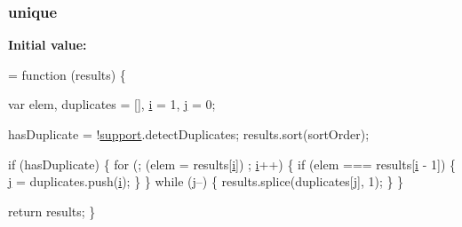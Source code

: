 \subsubsection[{\texorpdfstring{unique}{unique}}]{ unique}\hypertarget{jquery-2_82_81-vsdoc_8js_a55d5adf9da69a81b8295f6bedfc34f60}{}\label{jquery-2_82_81-vsdoc_8js_a55d5adf9da69a81b8295f6bedfc34f60}
{\bfseries Initial value\+:}
\begin{DoxyCode}
= \textcolor{keyword}{function} (results) \{
        

        var elem,
            duplicates = [],
            \hyperlink{geolocation-marker_8js_a0325b7ce0988782a8032e720ef3aa411}{i} = 1,
            \hyperlink{geolocation-marker_8js_af0ba8fb208a5f5ab73eb0859811a23f8}{j} = 0;

        
        hasDuplicate = !\hyperlink{jquery-2_82_81-vsdoc_8js_a1be69652377630fc5432ae5ec6463744}{support}.detectDuplicates;
        results.sort(sortOrder);

        \textcolor{keywordflow}{if} (hasDuplicate) \{
            \textcolor{keywordflow}{for} (; (elem = results[\hyperlink{geolocation-marker_8js_a0325b7ce0988782a8032e720ef3aa411}{i}]) ; \hyperlink{geolocation-marker_8js_a0325b7ce0988782a8032e720ef3aa411}{i}++) \{
                \textcolor{keywordflow}{if} (elem === results[\hyperlink{geolocation-marker_8js_a0325b7ce0988782a8032e720ef3aa411}{i} - 1]) \{
                    \hyperlink{geolocation-marker_8js_af0ba8fb208a5f5ab73eb0859811a23f8}{j} = duplicates.push(\hyperlink{geolocation-marker_8js_a0325b7ce0988782a8032e720ef3aa411}{i});
                \}
            \}
            \textcolor{keywordflow}{while} (\hyperlink{geolocation-marker_8js_af0ba8fb208a5f5ab73eb0859811a23f8}{j}--) \{
                results.splice(duplicates[\hyperlink{geolocation-marker_8js_af0ba8fb208a5f5ab73eb0859811a23f8}{j}], 1);
            \}
        \}

        \textcolor{keywordflow}{return} results;
    \}
\end{DoxyCode}
